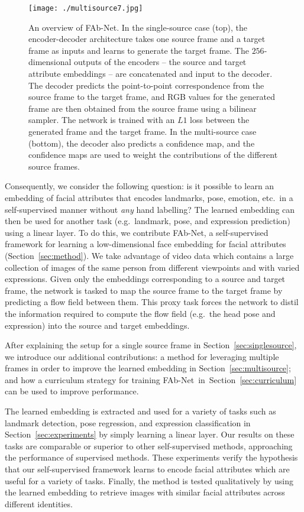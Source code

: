 \documentclass{bmvc2k}
\newcommand{\secref}[1]{Section~\ref{#1}}
\def\networkname{FAb-Net}
\begin{document}
\begin{figure}[h!]
\centering
\texttt{[image: ./multisource7.jpg]}

\caption{An overview of \networkname. 
In the single-source case (top), the encoder-decoder architecture
takes one source frame and a target frame as inputs and learns to
generate the target frame. The $256$-dimensional outputs of the
encoders -- the source and target attribute embeddings -- are
concatenated and input to the decoder.  The decoder predicts
the point-to-point correspondence from the source frame to the target frame, and RGB values
for the generated frame are then obtained from the source frame using a bilinear sampler.
The network is
trained with an  $L1$ loss between the generated frame and the target
frame. In the multi-source case (bottom), the decoder also predicts a
confidence map, and the confidence maps are used to weight  the contributions of the different
source frames.}

\label{fig:overview}
\end{figure}


Consequently, we consider the following question: is it possible to learn an embedding of facial attributes that encodes landmarks, pose, emotion, etc.~in a self-supervised manner without {\em any} hand labelling?
The learned embedding can then be used for another task (e.g.~landmark, pose, and expression prediction) using a linear layer.
To do this, we contribute \networkname, a self-supervised framework for learning a low-dimensional face embedding for facial attributes (\secref{sec:method}).
We take advantage of video data which contains a large collection of images of the same person from different viewpoints and with varied expressions.
Given only the embeddings corresponding to a source and target frame, the
network is tasked  to map  the source frame to the target frame by predicting a flow field between them.
This proxy task forces the network to distil the information required to compute the flow field (e.g.\ the head pose and expression) into the source and target embeddings. 

After explaining the setup for a single source frame in
\secref{sec:singlesource}, we introduce our additional contributions:
a method for
leveraging multiple frames in order to improve the learned embedding
in \secref{sec:multisource};  and how a curriculum strategy for training
\networkname~in~\secref{sec:curriculum} can be used to improve performance.

The learned embedding is extracted and used for a variety of tasks such as landmark detection, pose regression, and expression classification in \secref{sec:experiments} by simply learning a linear layer.
Our results on these tasks are comparable or superior to other self-supervised methods, approaching the performance of supervised methods.
These experiments verify the hypothesis that our self-supervised framework learns to encode facial attributes which are useful for a variety of tasks.
Finally, the method is tested qualitatively by using the learned embedding to retrieve images with similar facial attributes across different identities.
\end{document}
